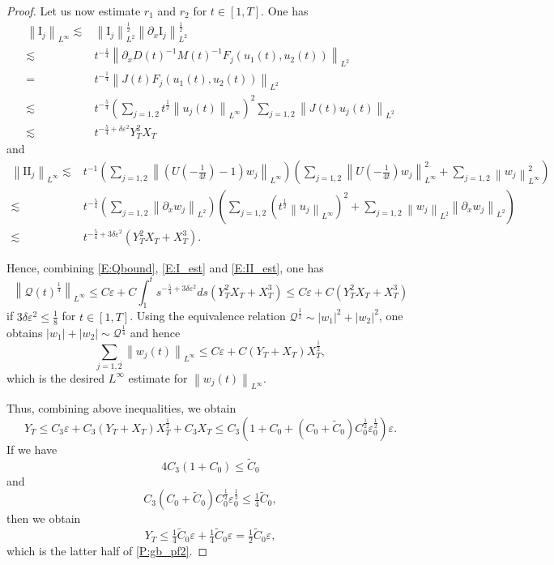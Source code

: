\documentclass[11pt,a4paper,oneside]{amsart}
\theoremstyle{plain}
\theoremstyle{remark}
\numberwithin{equation}{section}
\newcommand{\norm}[1]{\left\lVert #1\right\rVert}
\def\({\left(}
\def\){\right)}
\def\le{\leqslant}
\newcommand{\eps}{\varepsilon}
\theoremstyle{definition}
\begin{document}
\begin{proof}
Let us now estimate $r_1$ and $r_2$ for $t\in [1,T]$.
One has
\begin{equation}\label{E:I_est}
\begin{aligned}
	\norm{\mathrm{I}_j}_{L^\infty}
	\lesssim{}& 	\norm{\mathrm{I}_j}_{L^2}^\frac12
	\norm{\partial_x \mathrm{I}_j}_{L^2}^\frac12 \\
	\lesssim{}& t^{-\frac14} \norm{\partial_x D(t)^{-1} M(t)^{-1} F_j(u_1(t),u_2(t))}_{L^2} \\
	={}& t^{-\frac14} \norm{J(t) F_j(u_1(t),u_2(t))}_{L^2} \\
	\lesssim {}& t^{-\frac54} \(\sum_{j=1,2} t^{\frac12} \norm{u_j(t)}_{L^\infty} \)^2 \sum_{j=1,2}  \norm{J(t) u_j(t)}_{L^2}
\\
	\lesssim{}& t^{-\frac54+\delta \eps^2} Y_T^2 X_T
\end{aligned}
\end{equation}
and
\begin{equation}\label{E:II_est}
\begin{aligned}
	\norm{\mathrm{II}_j}_{L^\infty}
	\lesssim{}& 	t^{-1} \(\sum_{j=1,2} \norm{(U(-\tfrac1{4t})-1) w_j}_{L^\infty}\)
\(\sum_{j=1,2} \norm{U(-\tfrac1{4t}) w_j}_{L^\infty}^2 + \sum_{j=1,2} \norm{w_j}_{L^\infty}^2\)
 \\
	\lesssim{}& t^{-\frac54} \(\sum_{j=1,2} \norm{\partial_x w_j}_{L^2}\) 
\(\sum_{j=1,2} (t^{\frac12} \norm{u_j}_{L^\infty})^2 + \sum_{j=1,2} \norm{w_j}_{L^2} \norm{\partial_x w_j}_{L^2}\)
\\
	\lesssim{}& t^{-\frac54+3\delta \eps^2} (Y_T^2 X_T + X_T^3).
\end{aligned}
\end{equation}


Hence, combining \eqref{E:Qbound}, \eqref{E:I_est} and \eqref{E:II_est}, one has
\[
	\norm{\mathcal{Q}(t)^\frac14}_{L^\infty}
	\le C \eps + C \int_1^t 
	s^{-\frac54 + 3 \delta \eps^2}ds(Y_T^2 X_T + X_T^3)
 \le C\eps + C(Y_T^2 X_T + X_T^3)
\]
if $3 \delta \eps^2 \le \frac18$ for $t\in[1,T]$.
Using the equivalence relation
$\mathcal{Q}^\frac12 \sim |w_1|^2 + |w_2|^2$, one obtains $|w_1| + |w_2| \sim \mathcal{Q}^\frac14$ and hence
\[
	\sum_{j=1,2}\norm{w_j(t)}_{L^\infty} \le C \eps + C(Y_T+ X_T)  X_T^\frac12,
\]
which is the desired $L^\infty$ estimate for $\norm{w_j(t)}_{L^\infty}$.

Thus, combining above inequalities, we obtain
\[
	Y_T \le C_3 \eps + C_3(Y_T+ X_T)  X_T^\frac12 + C_3 X_T
\le C_3(1+ C_0 + (C_0+\widetilde{C}_0)C_0^{\frac12} \eps_0^{\frac12} )\eps.
\]
If we have
\begin{equation}\label{P:gb_pf5}
	4C_3(1+ C_0) \le \widetilde{C}_0
\end{equation}
and 
\begin{equation}\label{P:gb_pf6}
	C_3	(C_0+\widetilde{C}_0)C_0^{\frac12} \eps_0^{\frac12} 
\le \tfrac14 \widetilde{C}_0,
\end{equation}
then we obtain
\[
	Y_T \le \tfrac14 \widetilde{C}_0 \eps+ \tfrac14 \widetilde{C}_0 \eps =\tfrac12 \widetilde{C}_0 \eps,
\]
which is the latter half of \eqref{P:gb_pf2}.


\end{proof}
\end{document}
